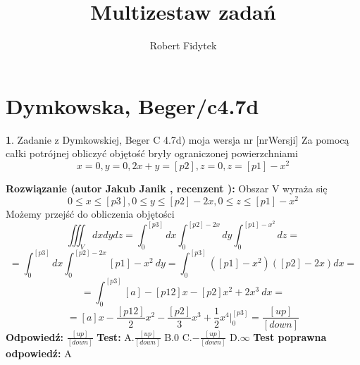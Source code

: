 \documentclass[12pt, a4paper]{article}
\title{Multizestaw zadań}
\author{Robert Fidytek}
\date{}
\theoremstyle{definition} %
\newtheorem{zad}{}
\newcommand{\kategoria}[1]{\section{#1}} %
\newcommand{\zadStart}[1]{\begin{zad}#1\newline} %
\newcommand{\zadStop}{\end{zad}}   %
\newcommand{\rozwStart}[2]{\noindent \textbf{Rozwiązanie (autor #1 , recenzent #2): }\newline} %
\newcommand{\rozwStop}{\newline}                                            %
\newcommand{\odpStart}{\noindent \textbf{Odpowiedź:}\newline}    %
\newcommand{\odpStop}{\newline}                                             %
\newcommand{\testStart}{\noindent \textbf{Test:}\newline} %
\newcommand{\testStop}{\newline} %
\newcommand{\kluczStart}{\noindent \textbf{Test poprawna odpowiedź:}\newline} %
\newcommand{\kluczStop}{\newline} %
\begin{document}
\maketitle


\kategoria{Dymkowska, Beger/c4.7d}
\zadStart{Zadanie z Dymkowskiej, Beger C 4.7d) moja wersja nr [nrWersji]}
Za pomocą całki potrójnej obliczyć objętość bryły ograniczonej powierzchniami
$$x=0, y=0, 2x+y=[p2], z=0, z=[p1]-x^2$$
\zadStop
\rozwStart{Jakub Janik}{}
Obszar V wyraża się $$0 \leq x \leq [p3], 0 \leq y \leq [p2]-2x, 0 \leq z \leq [p1]-x^2$$
Możemy przejść do obliczenia objętości
$$\iiint_V dxdydz=\int_0^{[p3]}dx\int_0^{[p2]-2x}dy\int_0^{[p1]-x^2}dz=$$
$$=\int_0^{[p3]}dx\int_0^{[p2]-2x}[p1]-x^2\ dy=\int_0^{[p3]}([p1]-x^2)([p2]-2x)dx=$$
$$=\int_0^{[p3]}[a]-[p12]x-[p2]x^2+2x^3\ dx=$$
$$=[a]x-\frac{[p12]}{2}x^2-\frac{[p2]}{3}x^3+\frac{1}{2}x^4\Big|_0^{[p3]}=\frac{[up]}{[down]}$$
\rozwStop
\odpStart
$\frac{[up]}{[down]}$
\odpStop
\testStart
A.$\frac{[up]}{[down]}$
B.$0$
C.$-\frac{[up]}{[down]}$
D.$\infty$
\testStop
\kluczStart
A
\kluczStop
\end{document}
